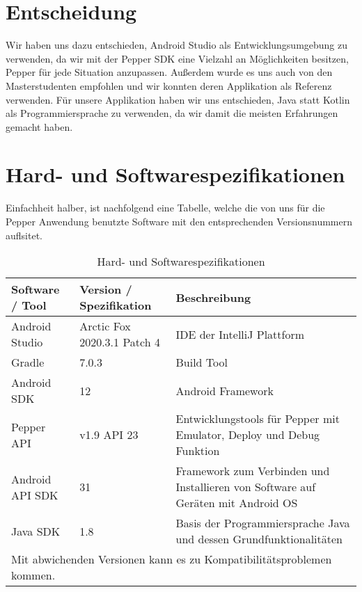 \section{Entscheidung}

Wir haben uns dazu entschieden, Android Studio als Entwicklungsumgebung zu verwenden, da wir mit der Pepper SDK eine Vielzahl an 
Möglichkeiten besitzen, Pepper für jede Situation anzupassen. Außerdem wurde es uns auch von den Masterstudenten empfohlen und wir konnten 
deren Applikation als Referenz verwenden. Für unsere Applikation haben wir uns entschieden, Java statt Kotlin als Programmiersprache zu 
verwenden, da wir damit die meisten Erfahrungen gemacht haben. 

\section{Hard- und Softwarespezifikationen}
Einfachheit halber, ist nachfolgend eine Tabelle, welche die von uns für die Pepper Anwendung benutzte Software mit den
entsprechenden Versionsnummern auflsitet.

\begin{table}[H]
    \caption{Hard- und Softwarespezifikationen}
    \label{table}
    \setlength{\tabcolsep}{3pt}
    \begin{tabular}{|p{100pt}|p{120pt}|p{180pt}|}
        \hline
        Software / Tool & Version / Spezifikation     & Beschreibung                                                                     \\
        \hline\hline
        Android Studio  & Arctic Fox 2020.3.1 Patch 4 & IDE der IntelliJ Plattform                                                       \\
        \hline
        Gradle          & 7.0.3                       & Build Tool                                                                       \\
        \hline
        Android SDK     & 12                          & Android Framework                                                                \\
        \hline
        Pepper API      & v1.9  API 23                & Entwicklungstools für Pepper mit Emulator, Deploy und Debug Funktion             \\
        \hline
        Android API SDK & 31                          & Framework zum Verbinden und Installieren von Software auf Geräten mit Android OS \\
        \hline
        Java SDK        & 1.8                         & Basis der Programmiersprache Java und dessen Grundfunktionalitäten               \\
        \hline
        \multicolumn{3}{p{380pt}}{Mit abwichenden Versionen kann es zu Kompatibilitätsproblemen kommen.}
    \end{tabular}
    \label{tab1}
\end{table}

